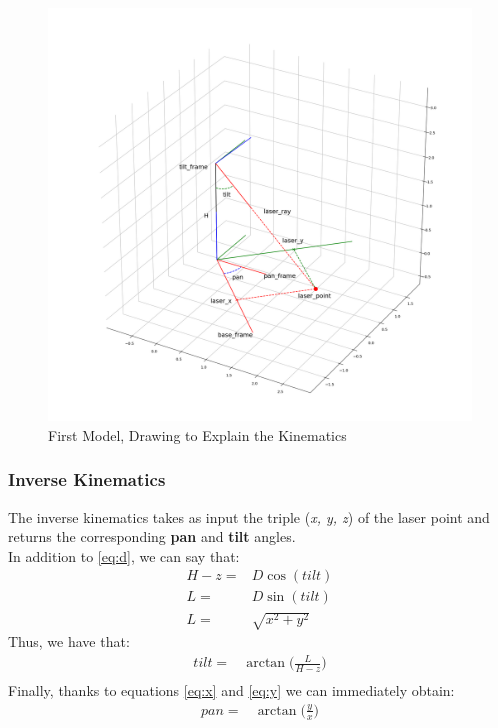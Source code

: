 \begin{figure}
	\centering
	\includegraphics[width=\textwidth]{img/model1XY.png}%
	\caption{First Model, Drawing to Explain the Kinematics}
	\label{fig:firstModelPanTilt}
\end{figure}
\subsubsection{Inverse Kinematics}
The inverse kinematics takes as input the triple (\textit{x, y, z}) of the laser point and returns the corresponding \textbf{pan} and \textbf{tilt} angles.\\
In addition to \ref{eq:d}, we can say that:
\begin{align}
    H-z =& D\cos(tilt)\\
	L =& D\sin(tilt) \label{eq:dsin}\\
	L=& \sqrt{x^2+y^2}
\end{align}
Thus, we have that:
\begin{align}
    tilt =& \arctan\bigg(\frac{L}{H-z}\bigg) \label{eq:tiltik}\\
\end{align}
Finally, thanks to equations \ref{eq:x} and \ref{eq:y} we can immediately obtain:
\begin{align}
	pan=& \arctan\bigg(\frac{y}{x}\bigg)\label{eq:panik}
\end{align}

